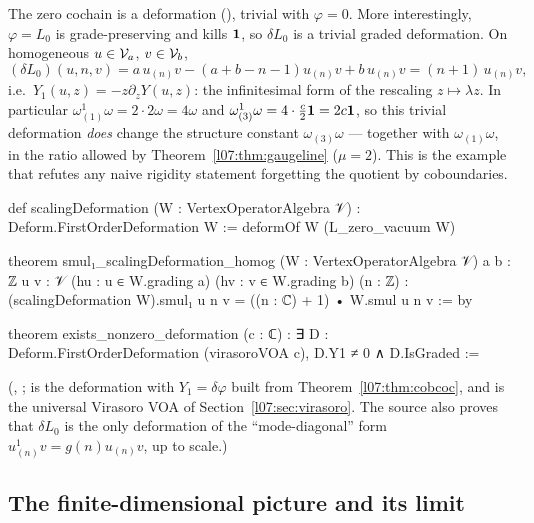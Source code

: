 \begin{example}\label{l07:ex:scaling}
The zero cochain is a deformation (), trivial with $\varphi = 0$. More
interestingly, $\varphi = L_0$ is grade-preserving and kills $\mathbf{1}$, so $\delta L_0$ is a trivial
graded deformation. On homogeneous $u\in\mathcal{V}_a$, $v\in\mathcal{V}_b$,
\begin{equation*}
 (\delta L_0)(u,n,v) = a\,u_{(n)}v - (a+b-n-1)u_{(n)}v + b\,u_{(n)}v = (n+1)\,u_{(n)}v,
\end{equation*}
i.e.\ $Y_1(u,z) = -z\partial_zY(u,z)$: the infinitesimal form of the rescaling $z\mapsto\lambda z$.
In particular $\omega^1_{(1)}\omega = 2\cdot2\omega = 4\omega$ and $\omega^1_{(3)}\omega = 4\cdot\frac c2\mathbf{1} = 2c\mathbf{1}$,
so this trivial deformation \emph{does} change the structure constant $\omega_{(3)}\omega$ --- together
with $\omega_{(1)}\omega$, in the ratio allowed by Theorem~\ref{l07:thm:gaugeline} ($\mu = 2$). This is the
example that refutes any naive rigidity statement forgetting the quotient by coboundaries.
\begin{leancode}
def scalingDeformation (W : VertexOperatorAlgebra 𝒱) : Deform.FirstOrderDeformation W :=
  deformOf W (L_zero_vacuum W)

theorem smul₁_scalingDeformation_homog (W : VertexOperatorAlgebra 𝒱) {a b : ℤ} {u v : 𝒱}
    (hu : u ∈ W.grading a) (hv : v ∈ W.grading b) (n : ℤ) :
    (scalingDeformation W).smul₁ u n v = ((n : ℂ) + 1) • W.smul u n v := by

theorem exists_nonzero_deformation (c : ℂ) :
    ∃ D : Deform.FirstOrderDeformation (virasoroVOA c), D.Y1 ≠ 0 ∧ D.IsGraded :=
\end{leancode}
(, ; 
is the deformation with $Y_1 = \delta\varphi$ built from Theorem~\ref{l07:thm:cobcoc}, and
 is the universal Virasoro VOA of Section~\ref{l07:sec:virasoro}. The source
also proves that $\delta L_0$ is the only deformation of the ``mode-diagonal'' form
$u^1_{(n)}v = g(n)u_{(n)}v$, up to scale.)
\end{example}

\subsection{The finite-dimensional picture and its limit}\label{l07:sec:tridegree}

